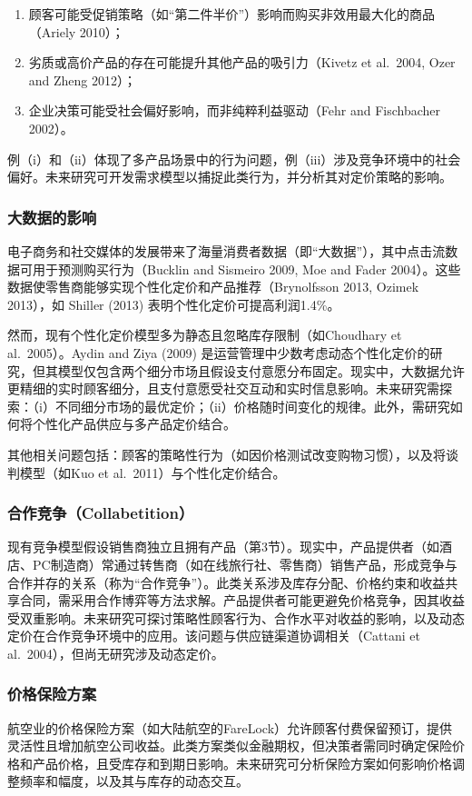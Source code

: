 \begin{enumerate}
	\def\labelenumi{\roman{enumi}.}
	\item 顾客可能受促销策略（如“第二件半价”）影响而购买非效用最大化的商品（Ariely 2010）；
	\item 劣质或高价产品的存在可能提升其他产品的吸引力（Kivetz et al.~2004, Ozer and Zheng 2012）；
	\item 企业决策可能受社会偏好影响，而非纯粹利益驱动（Fehr and Fischbacher 2002）。
\end{enumerate}

例（i）和（ii）体现了多产品场景中的行为问题，例（iii）涉及竞争环境中的社会偏好。未来研究可开发需求模型以捕捉此类行为，并分析其对定价策略的影响。

\subsubsection{大数据的影响}
电子商务和社交媒体的发展带来了海量消费者数据（即“大数据”），其中点击流数据可用于预测购买行为（Bucklin and Sismeiro 2009, Moe and Fader 2004）。这些数据使零售商能够实现个性化定价和产品推荐（Brynolfsson 2013, Ozimek 2013），如 Shiller (2013) 表明个性化定价可提高利润1.4\%。

然而，现有个性化定价模型多为静态且忽略库存限制（如Choudhary et al.~2005）。Aydin and Ziya (2009) 是运营管理中少数考虑动态个性化定价的研究，但其模型仅包含两个细分市场且假设支付意愿分布固定。现实中，大数据允许更精细的实时顾客细分，且支付意愿受社交互动和实时信息影响。未来研究需探索：（i）不同细分市场的最优定价；（ii）价格随时间变化的规律。此外，需研究如何将个性化产品供应与多产品定价结合。

其他相关问题包括：顾客的策略性行为（如因价格测试改变购物习惯），以及将谈判模型（如Kuo et al.~2011）与个性化定价结合。

\subsubsection{合作竞争（Collabetition）}
现有竞争模型假设销售商独立且拥有产品（第3节）。现实中，产品提供者（如酒店、PC制造商）常通过转售商（如在线旅行社、零售商）销售产品，形成竞争与合作并存的关系（称为“合作竞争”）。此类关系涉及库存分配、价格约束和收益共享合同，需采用合作博弈等方法求解。产品提供者可能更避免价格竞争，因其收益受双重影响。未来研究可探讨策略性顾客行为、合作水平对收益的影响，以及动态定价在合作竞争环境中的应用。该问题与供应链渠道协调相关（Cattani et al.~2004），但尚无研究涉及动态定价。

\subsubsection{价格保险方案}
航空业的价格保险方案（如大陆航空的FareLock）允许顾客付费保留预订，提供灵活性且增加航空公司收益。此类方案类似金融期权，但决策者需同时确定保险价格和产品价格，且受库存和到期日影响。未来研究可分析保险方案如何影响价格调整频率和幅度，以及其与库存的动态交互。

